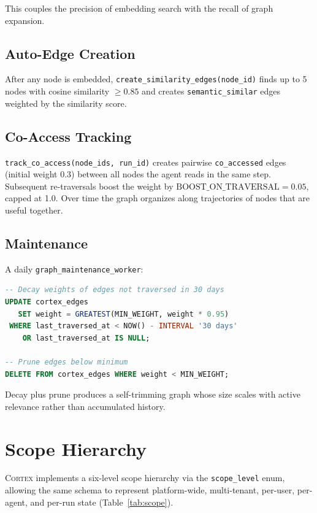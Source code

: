 \documentclass[11pt,a4paper]{article}
\theoremstyle{cortexprop}
\newcommand{\code}[1]{\texttt{#1}}
\begin{document}
This couples the precision of embedding search with the recall of graph
expansion.

\subsection{Auto-Edge Creation}

After any node is embedded, \code{create\_similarity\_edges(node\_id)}
finds up to 5 nodes with cosine similarity $\geq 0.85$ and creates
\code{semantic\_similar} edges weighted by the similarity score.

\subsection{Co-Access Tracking}

\code{track\_co\_access(node\_ids, run\_id)} creates pairwise
\code{co\_accessed} edges (initial weight 0.3) between all nodes the
agent reads in the same step. Subsequent re-traversals boost the weight
by $\text{BOOST\_ON\_TRAVERSAL} = 0.05$, capped at 1.0. Over time the
graph organizes along trajectories of nodes that are useful together.

\subsection{Maintenance}

A daily \code{graph\_maintenance\_worker}:

\begin{lstlisting}[language=SQL]
-- Decay weights of edges not traversed in 30 days
UPDATE cortex_edges
   SET weight = GREATEST(MIN_WEIGHT, weight * 0.95)
 WHERE last_traversed_at < NOW() - INTERVAL '30 days'
    OR last_traversed_at IS NULL;

-- Prune edges below minimum
DELETE FROM cortex_edges WHERE weight < MIN_WEIGHT;
\end{lstlisting}

Decay plus prune produces a self-trimming graph whose size scales with
active relevance rather than accumulated history.

\section{Scope Hierarchy}
\label{sec:scope}

\textsc{Cortex} implements a six-level scope hierarchy via the
\code{scope\_level} enum, allowing the same schema to represent
platform-wide, multi-tenant, per-user, per-agent, and per-run state
(Table~\ref{tab:scope}).
\end{document}
